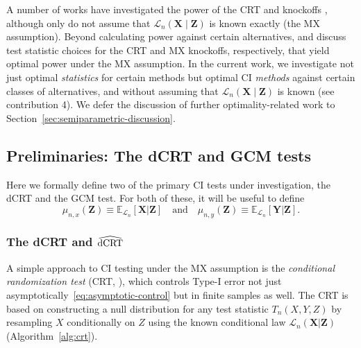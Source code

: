 \documentclass[aos]{imsart}
\theoremstyle{plain}
\theoremstyle{remark}
\newcommand{\E}{\mathbb E}								%
\newcommand{\prx}{\bm X}								%
\newcommand{\srx}{X}									%
\newcommand{\prz}{\bm Z}								%
\newcommand{\srz}{Z}									%
\newcommand{\pry}{{\bm Y}}								%
\newcommand{\sry}{Y}									%
\newcommand{\law}{\mathcal L}							%
\newcommand{\dCRThat}{\widehat{\textnormal{dCRT}}}		%
\begin{document}
A number of works have investigated the power of the CRT and knockoffs \citep{Weinstein2017, Liu2019, Weinstein2020, Fan2018a, Fan2020, Katsevich2020a, Wang2020b, Spector2022a}, although only \citet{Fan2018a, Fan2020, Katsevich2020a} do not assume that $\law_n(\prx \mid \prz)$ is known exactly (the MX assumption). Beyond calculating power against certain alternatives, \citet{Katsevich2020a} and \citet{Spector2022a} discuss test statistic choices for the CRT and MX knockoffs, respectively, that yield optimal power under the MX assumption. In the current work, we investigate not just optimal \textit{statistics} for certain methods but optimal CI \textit{methods} against certain classes of alternatives, and without assuming that $\law_n(\prx \mid \prz)$ is known (see contribution 4). We defer the discussion of further optimality-related work to Section~\ref{sec:semiparametric-discussion}.

\subsection{Preliminaries: The dCRT and GCM tests} \label{sec:notation-definitions-preliminaries}

Here we formally define two of the primary CI tests under investigation, the dCRT and the GCM test. For both of these, it will be useful to define
\begin{equation}
    \mu_{n,x}(\prz) \equiv \E_{\law_n}[\prx|\prz] \quad \text{and} \quad \mu_{n,y}(\prz) \equiv \E_{\law_n}[\pry|\prz].
\end{equation}

\subsubsection{The dCRT and $\dCRThat$}

A simple approach to CI testing under the MX assumption is the \textit{conditional randomization test} (CRT, \cite{CetL16}), which controls Type-I error not just asymptotically~\eqref{eq:asymptotic-control} but in finite samples as well. The CRT is based on constructing a null distribution for any test statistic $T_n(\srx, \sry, \srz)$ by resampling $\srx$ conditionally on $\srz$ using the known conditional law $\law_n(\prx|\prz)$ (Algorithm~\ref{alg:crt}). 
\end{document}
